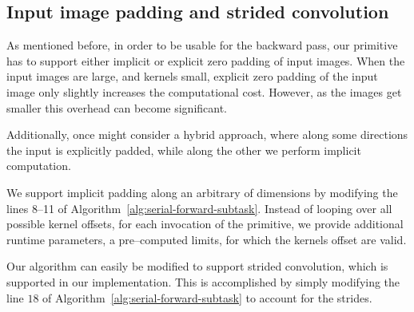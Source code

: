   \subsection{Input image padding and strided convolution}


  As mentioned before, in order to be usable for the backward pass,
  our primitive has to support either implicit or explicit zero
  padding of input images.  When the input images are large, and
  kernels small, explicit zero padding of the input image only
  slightly increases the computational cost.  However, as the images
  get smaller this overhead can become significant.

  Additionally, once might consider a hybrid approach, where along
  some directions the input is explicitly padded, while along the
  other we perform implicit computation.

  We support implicit padding along an arbitrary of dimensions by
  modifying the lines 8--11 of
  Algorithm~\ref{alg:serial-forward-subtask}.  Instead of looping over
  all possible kernel offsets, for each invocation of the primitive,
  we provide additional runtime parameters, a pre--computed limits,
  for which the kernels offset are valid.

  Our algorithm can easily be modified to support strided convolution,
  which is supported in our implementation.  This is accomplished by
  simply modifying the line $18$ of
  Algorithm~\ref{alg:serial-forward-subtask} to account for the
  strides.
